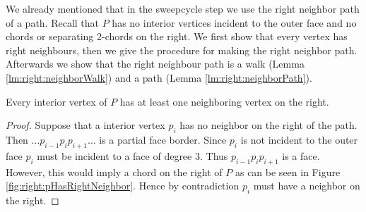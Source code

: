     We already mentioned that in the sweepcycle step we use the right neighbor path of a path. Recall that  $P$ has no interior vertices incident to the outer face and no chords or separating 2-chords on the right. We first show that every vertex has right neighbours, then we give the procedure for making the right neighbor path. Afterwards we show that the right neighbour path is a walk (Lemma \ref{lm:right:neighborWalk}) and a path (Lemma \ref{lm:right:neighborPath}).

    \begin{lemma}
      \label{lm:right:pHasRightNeihgbours}
      Every interior vertex of $P$ has at least one neighboring vertex on the right.
    \end{lemma}

    \begin{proof}
      Suppose that a interior vertex $p_i$ has no neighbor on the right of the path. Then $ \ldots p_{i-1} p_i p_{i+1} \ldots $ is a partial face border. Since $p_i$ is not incident to the outer face $p_i$ must be incident to a face of degree $3$. Thus $p_{i-1} p_i p_{i+1}$ is a face. However, this would imply a chord on the right of $P$ as can be seen in Figure \ref{fig:right:pHasRightNeighbor}. Hence by contradiction $p_i$ must have a neighbor on the right.
    \end{proof}

